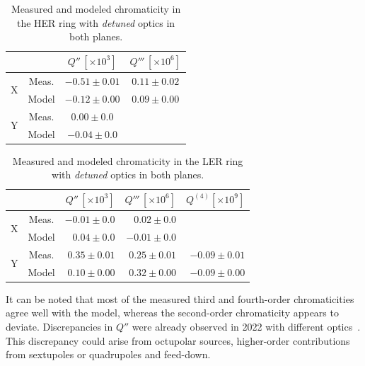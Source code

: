 \begin{table}[!htb]
    \centering
    \begin{tabular}{cccc}
        \toprule
            & & \(Q'' \, [\times 10^3]\) & \(Q''' \, [\times 10^6]\) \\ 
        \midrule
        \multirow{2}{*}{X} & Meas. & $-0.51 \pm 0.01$ & $0.11 \pm 0.02$ \\
                        & Model & $-0.12 \pm 0.00$ & $0.09 \pm 0.00$ \\
        \midrule
        \multirow{2}{*}{Y} & Meas. & $0.00 \pm 0.0$ & \\
                        & Model & $-0.04 \pm 0.0$ & \\
        \bottomrule
    \end{tabular}
    \caption{Measured and modeled chromaticity in the HER ring with \textit{detuned} optics in both
    planes.}
    \label{tab:kek:her_chroma_detuned}
\end{table}

\begin{table}[!htb]
    \centering
    \begin{tabular}{ccrrr}
        \toprule
            & & \(Q'' \, [\times 10^3]\) & \(Q''' \, [\times 10^6]\) & $Q^{(4)} [\times 10^9]$\\ 
        \midrule
        \multirow{2}{*}{X} & Meas. & $-0.01 \pm 0.0$ & $ 0.02 \pm 0.0$ \\
                        & Model & $ 0.04 \pm 0.0$ & $-0.01 \pm 0.0$ \\
        \midrule
        \multirow{2}{*}{Y} & Meas. & $0.35 \pm 0.01$ & $0.25 \pm 0.01$ & $-0.09 \pm 0.01$\\
                        & Model & $0.10 \pm 0.00$ & $0.32 \pm 0.00$ & $-0.09 \pm 0.00$ \\
        \bottomrule
    \end{tabular}
    \caption{Measured and modeled chromaticity in the LER ring with \textit{detuned} optics in both
    planes.}
    \label{tab:kek:ler_chroma_detuned}
\end{table}

It can be noted that most of the measured third and fourth-order chromaticities agree well with the
model, whereas the second-order chromaticity appears to deviate. Discrepancies in $Q''$ were
already observed in 2022 with different optics~\cite{keintzel_jacqueline_beam_2022}. This
discrepancy could arise from octupolar sources, higher-order contributions from sextupoles or quadrupoles
and feed-down.



